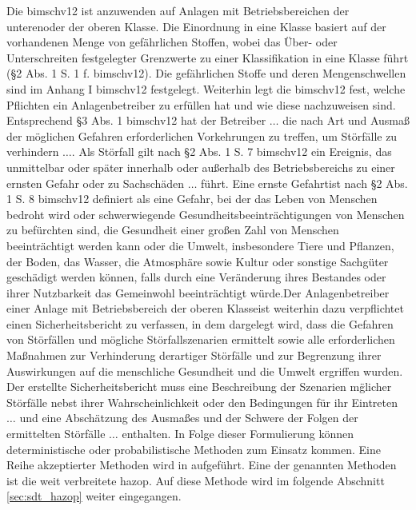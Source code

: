 Die \ac{bimschv12} ist anzuwenden auf Anlagen mit Betriebsbereichen \glqq der unteren\grqq { }oder \glqq der oberen Klasse. Die Einordnung in eine Klasse basiert auf der vorhandenen Menge von gef\"ahrlichen Stoffen, wobei das {\"Uber- oder Unterschreiten} festgelegter Grenzwerte zu einer Klassifikation in eine Klasse f\"uhrt {(\S 2 Abs. 1 S. 1 f. \ac{bimschv12})}. Die gef\"ahrlichen Stoffe und deren Mengenschwellen sind im {Anhang I \ac{bimschv12}} festgelegt. \newline
Weiterhin legt die \ac{bimschv12} fest, welche Pflichten ein Anlagenbetreiber zu erf\"ullen hat und wie diese nachzuweisen sind. Entsprechend {\S 3 Abs. 1 \ac{bimschv12}} hat der Betreiber \glqq $\dots$ die nach Art und Ausma\ss{} der m\"oglichen Gefahren erforderlichen Vorkehrungen zu treffen, um St\"orf\"alle zu verhindern $\dots$\grqq { }. Als St\"orfall gilt nach {\S 2 Abs. 1 S. 7 \ac{bimschv12}} \glqq ein Ereignis, das unmittelbar oder sp\"ater innerhalb oder au\ss{}erhalb des Betriebsbereichs zu einer ernsten Gefahr oder zu Sachsch\"aden $\dots$ f\"uhrt\grqq { }. Eine \glqq ernste Gefahrt\grqq { }ist nach {\S 2 Abs. 1 S. 8 \ac{bimschv12}} definiert als \glqq eine Gefahr, bei der das Leben von Menschen bedroht wird oder schwerwiegende Gesundheitsbeeintr\"achtigungen von Menschen zu bef\"urchten sind, die Gesundheit einer gro\ss{}en Zahl von Menschen beeintr\"achtigt werden kann oder die Umwelt, insbesondere Tiere und Pflanzen, der Boden, das Wasser, die Atmosph\"are sowie Kultur oder sonstige Sachg\"uter gesch\"adigt werden k\"onnen, falls durch eine Ver\"anderung ihres Bestandes
oder ihrer Nutzbarkeit das Gemeinwohl beeintr\"achtigt w\"urde.\grqq { }Der Anlagenbetreiber einer Anlage mit Betriebsbereich der \glqq oberen Klasse\grqq { }ist weiterhin dazu verpflichtet einen Sicherheitsbericht zu verfassen, in dem dargelegt wird, dass \glqq die Gefahren von St\"orf\"allen und m\"ogliche St\"orfallszenarien ermittelt sowie alle erforderlichen Ma\ss{}nahmen zur Verhinderung derartiger St\"orf\"alle und zur Begrenzung ihrer Auswirkungen auf die menschliche Gesundheit und die Umwelt ergriffen wurden. Der erstellte Sicherheitsbericht muss eine \glqq Beschreibung  der Szenarien m\"glicher St\"orf\"alle nebst ihrer Wahrscheinlichkeit oder den
Bedingungen für ihr Eintreten $\dots$ und eine \glqq Absch\"atzung des Ausma\ss{}es und der Schwere der Folgen der ermittelten St\"orf\"alle $\dots$ enthalten. In Folge dieser Formulierung k\"onnen deterministische oder probabilistische Methoden zum Einsatz kommen. Eine Reihe akzeptierter Methoden wird in  \cite[S. 20 f.]{2009_bimschv12Hilfe} aufgef\"uhrt. Eine der genannten Methoden ist die weit verbreitete \ac{hazop}. Auf diese Methode wird im folgende Abschnitt \ref{sec:sdt_hazop} weiter eingegangen.
